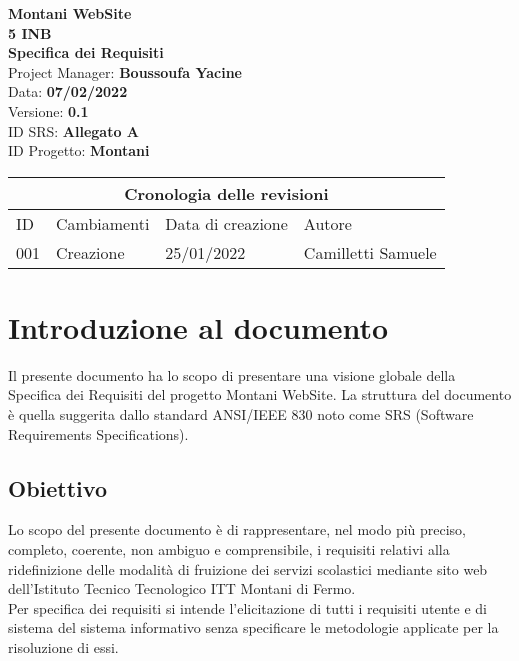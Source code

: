 \documentclass{article}
\begin{document}
	
	
	\begin{titlepage}
		\begin{center}
			\huge\textbf{Montani WebSite}\\
			\Large\textbf{5 INB}\\
			\Large \textbf{Specifica dei Requisiti}\\
			\vspace{4cm}
			\large Project Manager: \textbf{Boussoufa Yacine}\\
			\large Data: \textbf{07/02/2022}\\
			\large Versione:\textbf{ 0.1}\\
			\large ID SRS: \textbf{Allegato A}\\
			\large ID Progetto: \textbf{Montani}\\
			
		\end{center}
	\end{titlepage}
	
	\clearpage
	
	\begin{tabular}{ |p{1cm}|p{4cm}|p{3cm}|p{2cm}|  }
		\hline
		\multicolumn{4}{|c|}{Cronologia delle revisioni} \\
		\hline
		ID& Cambiamenti &Data di creazione&Autore\\
		\hline
		001   & Creazione    &25/01/2022&   Camilletti Samuele\\
\hline
	\end{tabular}
	
	\clearpage
	
	\tableofcontents
	\printindex	
	
   

	\section{\textbf{Introduzione al documento}}
	\flushleft
	\normalsize
	Il presente documento ha lo scopo di presentare una visione globale della Specifica dei Requisiti del progetto Montani WebSite. La struttura del documento è quella suggerita dallo standard ANSI/IEEE  830 noto come SRS (Software Requirements Specifications).
	\normalsize
	 \subsection{\textbf{Obiettivo}} 
	\flushleft
	\normalsize
	Lo scopo del presente documento è di rappresentare, nel modo più preciso, completo, coerente, non  ambiguo e comprensibile, i requisiti relativi alla ridefinizione delle modalità di fruizione dei servizi scolastici mediante sito web dell'Istituto Tecnico Tecnologico ITT Montani di Fermo.\\ 
	Per specifica dei requisiti si intende l’elicitazione di tutti i requisiti utente e di sistema del sistema informativo senza specificare le metodologie applicate per la risoluzione di essi.
	
\end{document}
